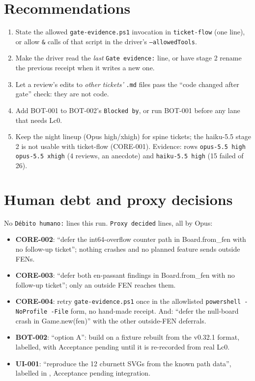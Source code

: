 \documentclass[11pt,a4paper]{article}
\begin{document}
\section*{Recommendations}

\begin{enumerate}
  \item State the allowed \texttt{gate-evidence.ps1} invocation in \texttt{ticket-flow}
        (one line), or allow \texttt{\&} calls of that script in the driver's
        \texttt{--allowedTools}.
  \item Make the driver read the \emph{last} \texttt{Gate evidence:} line, or have stage 2
        rename the previous receipt when it writes a new one.
  \item Let a review's edits to \emph{other tickets'} \texttt{.md} files pass the
        ``code changed after gate'' check: they are not code.
  \item Add BOT-001 to BOT-002's \texttt{Blocked by}, or run BOT-001 before any lane that
        needs Lc0.
  \item Keep the night lineup (Opus high/xhigh) for spine tickets; the haiku-5.5 stage 2 is
        not usable with ticket-flow (CORE-001). Evidence: rows
        \texttt{opus-5.5 high \textrightarrow{} opus-5.5 xhigh} (4 reviews, an anecdote) and
        \texttt{haiku-5.5 high} (15 failed of 26).
\end{enumerate}

\section*{Human debt and proxy decisions}

No \texttt{Débito humano:} lines this run. \texttt{Proxy decided} lines, all by Opus:

\begin{itemize}
  \item \textbf{CORE-002}: ``defer the int64-overflow counter path in Board.from\_fen with no
        follow-up ticket''; nothing crashes and no planned feature sends outside FENs.
  \item \textbf{CORE-003}: ``defer both en-passant findings in Board.from\_fen with no
        follow-up ticket''; only an outside FEN reaches them.
  \item \textbf{CORE-004}: retry \texttt{gate-evidence.ps1} once in the allowlisted
        \texttt{powershell -NoProfile -File} form, no hand-made receipt. And: ``defer the
        null-board crash in Game.new(fen)'' with the other outside-FEN deferrals.
  \item \textbf{BOT-002}: ``option A'': build on a fixture rebuilt from the v0.32.1 format,
        labelled, with Acceptance pending until it is re-recorded from real Lc0.
  \item \textbf{UI-001}: ``reproduce the 12 cburnett SVGs from the known path data'',
        labelled in , Acceptance pending integration.
\end{itemize}
\end{document}
